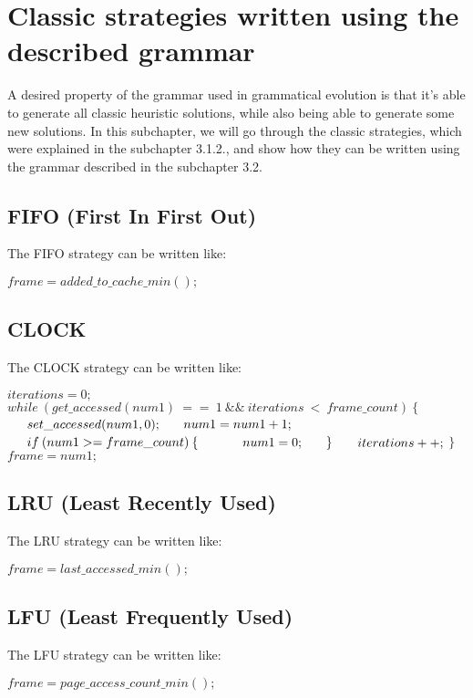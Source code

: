 \section{Classic strategies written using the described grammar}
A desired property of the grammar used in grammatical evolution is that it's able to generate all classic heuristic solutions, while also being able to generate some new solutions. In this subchapter, we will go through the classic strategies, which were explained in the subchapter 3.1.2., and show how they can be written using the grammar described in the subchapter 3.2.

\subsection{FIFO (First In First Out)}

The FIFO strategy can be written like:

\noindent
\begin{algorithmic}
\State $frame = added\_to\_cache\_min();$
\end{algorithmic}

\subsection{CLOCK}

The CLOCK strategy can be written like:

\noindent
\begin{algorithmic}
\State $ iterations = 0;$
\State $ while\:(get\_accessed(num1)\:==\:1\:\&\& \:iterations \:<\:frame\_count)\:\{$
\State $ \indent set\_accessed(num1, 0);$
\State $ \indent num1 = num1 + 1;$
\State $ \indent if\:(num1 >= frame\_count)\:\{$
\State $ \indent\indent num1 = 0;$
\State $ \indent \}$
\State $ \indent iterations++;$
\State $ \}$
\State $frame = num1;$
\end{algorithmic}

\subsection{LRU (Least Recently Used)}

The LRU strategy can be written like:

\noindent
\begin{algorithmic}
\State $frame = last\_accessed\_min();$
\end{algorithmic}

\subsection{LFU (Least Frequently Used)}

The LFU strategy can be written like:

\noindent
\begin{algorithmic}
\State $frame = page\_access\_count\_min();$
\end{algorithmic}